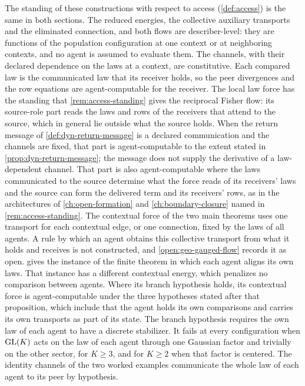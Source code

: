 The standing of these constructions with respect to access (\cref{def:access}) is the same in both sections. The reduced energies, the collective auxiliary transports and the eliminated connection, and both flows are describer-level: they are functions of the population configuration at one context or at neighboring contexts, and no agent is assumed to evaluate them. The channels, with their declared dependence on the laws at a context, are constitutive. Each compared law is the communicated law that its receiver holds, so the peer divergences and the row equations are agent-computable for the receiver. The local law force has the standing that \cref{rem:access-standing} gives the reciprocal Fisher flow: its source-role part reads the laws and rows of the receivers that attend to the source, which in general lie outside what the source holds. When the return message of \cref{def:dyn-return-message} is a declared communication and the channels are fixed, that part is agent-computable to the extent stated in \cref{prop:dyn-return-message}; the message does not supply the derivative of a law-dependent channel. That part is also agent-computable where the laws communicated to the source determine what the force reads of its receivers' laws and the source can form the delivered term and its receivers' rows, as in the architectures of \cref{ch:open-formation} and \cref{ch:boundary-closure} named in \cref{rem:access-standing}. The contextual force of the two main theorems uses one transport for each contextual edge, or one connection, fixed by the laws of all agents. A rule by which an agent obtains this collective transport from what it holds and receives is not constructed, and \cref{open:geo-gauged-flow} records it as open.  gives the instance of the finite theorem in which each agent aligns its own laws. That instance has a different contextual energy, which penalizes no comparison between agents. Where its branch hypothesis holds, its contextual force is agent-computable under the three hypotheses stated after that proposition, which include that the agent holds its own comparisons and carries its own transports as part of its state. The branch hypothesis requires the own law of each agent to have a discrete stabilizer. It fails at every configuration when $\mathrm{GL}(K)$ acts on the law of each agent through one Gaussian factor and trivially on the other sector, for $K\geq3$, and for $K\geq2$ when that factor is centered. The identity channels of the two worked examples communicate the whole law of each agent to its peer by hypothesis.


